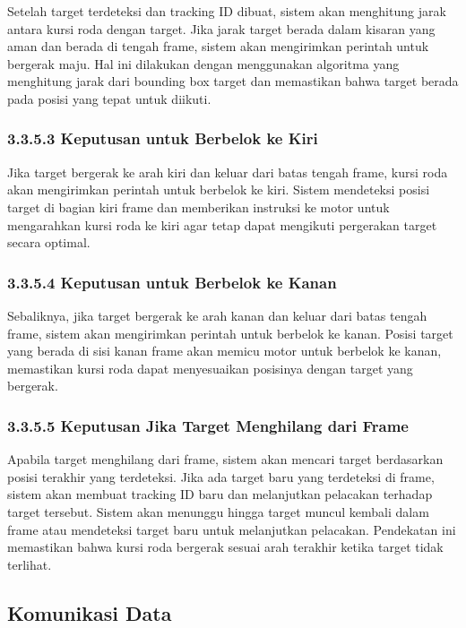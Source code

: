 Setelah target terdeteksi dan tracking ID dibuat, sistem akan menghitung jarak antara kursi roda dengan target. Jika jarak target berada dalam kisaran yang aman dan berada di tengah frame, sistem akan mengirimkan perintah untuk bergerak maju. Hal ini dilakukan dengan menggunakan algoritma yang menghitung jarak dari bounding box target dan memastikan bahwa target berada pada posisi yang tepat untuk diikuti.

\subsubsection{3.3.5.3 Keputusan untuk Berbelok ke Kiri}
\label{subsubsec:keputusan_belok_kiri}

Jika target bergerak ke arah kiri dan keluar dari batas tengah frame, kursi roda akan mengirimkan perintah untuk berbelok ke kiri. Sistem mendeteksi posisi target di bagian kiri frame dan memberikan instruksi ke motor untuk mengarahkan kursi roda ke kiri agar tetap dapat mengikuti pergerakan target secara optimal.

\subsubsection{3.3.5.4 Keputusan untuk Berbelok ke Kanan}
\label{subsubsec:keputusan_belok_kanan}

Sebaliknya, jika target bergerak ke arah kanan dan keluar dari batas tengah frame, sistem akan mengirimkan perintah untuk berbelok ke kanan. Posisi target yang berada di sisi kanan frame akan memicu motor untuk berbelok ke kanan, memastikan kursi roda dapat menyesuaikan posisinya dengan target yang bergerak.

\subsubsection{3.3.5.5 Keputusan Jika Target Menghilang dari Frame}
\label{subsubsec:keputusan_target_menghilang}

Apabila target menghilang dari frame, sistem akan mencari target berdasarkan posisi terakhir yang terdeteksi. Jika ada target baru yang terdeteksi di frame, sistem akan membuat tracking ID baru dan melanjutkan pelacakan terhadap target tersebut. Sistem akan menunggu hingga target muncul kembali dalam frame atau mendeteksi target baru untuk melanjutkan pelacakan. Pendekatan ini memastikan bahwa kursi roda bergerak sesuai arah terakhir ketika target tidak terlihat.

\subsection{Komunikasi Data}
\label{subsec:komunikasi_data}

